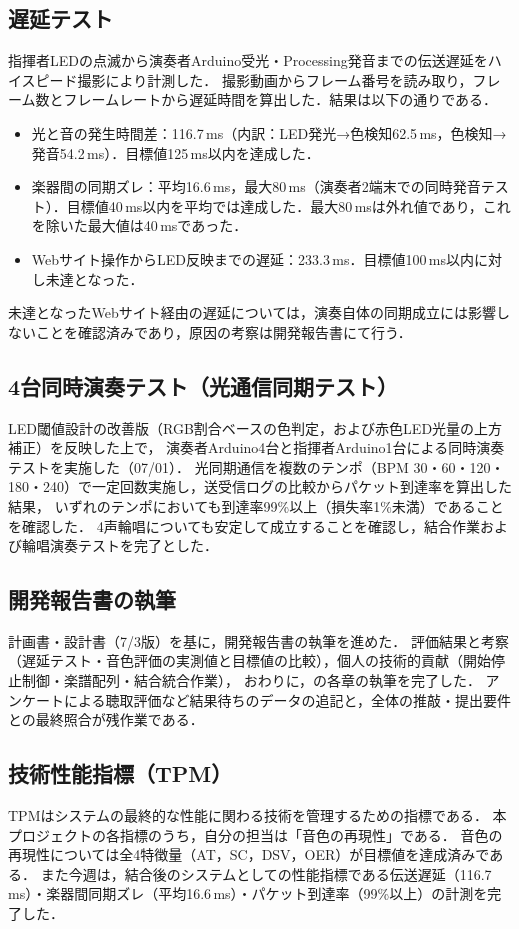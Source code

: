\documentclass[lualatex,paper=a4paper,jafontsize=11.5pt,jafontscale=1.05]{jlreq}
\begin{document}
\subsection{遅延テスト}
指揮者LEDの点滅から演奏者Arduino受光・Processing発音までの伝送遅延をハイスピード撮影により計測した．
撮影動画からフレーム番号を読み取り，フレーム数とフレームレートから遅延時間を算出した．結果は以下の通りである．
\begin{itemize}
  \item 光と音の発生時間差：116.7\,ms（内訳：LED発光→色検知62.5\,ms，色検知→発音54.2\,ms）．目標値125\,ms以内を達成した．
  \item 楽器間の同期ズレ：平均16.6\,ms，最大80\,ms（演奏者2端末での同時発音テスト）．目標値40\,ms以内を平均では達成した．最大80\,msは外れ値であり，これを除いた最大値は40\,msであった．
  \item Webサイト操作からLED反映までの遅延：233.3\,ms．目標値100\,ms以内に対し未達となった．
\end{itemize}
未達となったWebサイト経由の遅延については，演奏自体の同期成立には影響しないことを確認済みであり，原因の考察は開発報告書にて行う．

\subsection{4台同時演奏テスト（光通信同期テスト）}
LED閾値設計の改善版（RGB割合ベースの色判定，および赤色LED光量の上方補正）を反映した上で，
演奏者Arduino4台と指揮者Arduino1台による同時演奏テストを実施した（07/01）．
光同期通信を複数のテンポ（BPM 30・60・120・180・240）で一定回数実施し，送受信ログの比較からパケット到達率を算出した結果，
いずれのテンポにおいても到達率99\%以上（損失率1\%未満）であることを確認した．
4声輪唱についても安定して成立することを確認し，結合作業および輪唱演奏テストを完了とした．

\subsection{開発報告書の執筆}
計画書・設計書（7/3版）を基に，開発報告書の執筆を進めた．
評価結果と考察（遅延テスト・音色評価の実測値と目標値の比較），個人の技術的貢献（開始停止制御・楽譜配列・結合統合作業），
おわりに，の各章の執筆を完了した．
アンケートによる聴取評価など結果待ちのデータの追記と，全体の推敲・提出要件との最終照合が残作業である．

\subsection{技術性能指標（TPM）}
TPMはシステムの最終的な性能に関わる技術を管理するための指標である．
本プロジェクトの各指標のうち，自分の担当は「音色の再現性」である．
音色の再現性については全4特徴量（AT，SC，DSV，OER）が目標値を達成済みである．
また今週は，結合後のシステムとしての性能指標である伝送遅延（116.7\,ms）・楽器間同期ズレ（平均16.6\,ms）・パケット到達率（99\%以上）の計測を完了した．
\end{document}
